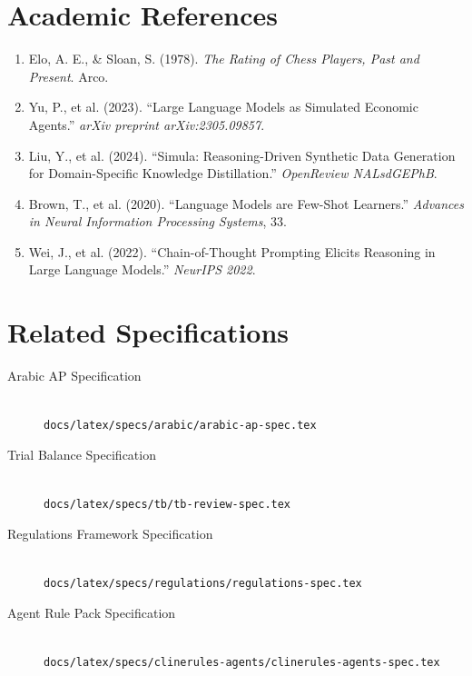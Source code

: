 \documentclass[12pt,a4paper,twoside]{report}
\begin{document}
\section{Academic References}

\begin{enumerate}
\item Elo, A. E., \& Sloan, S. (1978). \emph{The Rating of Chess Players, Past and Present}. Arco.

\item Yu, P., et al. (2023). ``Large Language Models as Simulated Economic Agents.''
\emph{arXiv preprint arXiv:2305.09857}.

\item Liu, Y., et al. (2024). ``Simula: Reasoning-Driven Synthetic Data Generation for
Domain-Specific Knowledge Distillation.'' \emph{OpenReview NALsdGEPhB}.

\item Brown, T., et al. (2020). ``Language Models are Few-Shot Learners.''
\emph{Advances in Neural Information Processing Systems}, 33.

\item Wei, J., et al. (2022). ``Chain-of-Thought Prompting Elicits Reasoning in Large
Language Models.'' \emph{NeurIPS 2022}.
\end{enumerate}

\section{Related Specifications}

\begin{description}
\item[Arabic AP Specification] \hfill \\
\texttt{docs/latex/specs/arabic/arabic-ap-spec.tex}

\item[Trial Balance Specification] \hfill \\
\texttt{docs/latex/specs/tb/tb-review-spec.tex}

\item[Regulations Framework Specification] \hfill \\
\texttt{docs/latex/specs/regulations/regulations-spec.tex}

\item[Agent Rule Pack Specification] \hfill \\
\texttt{docs/latex/specs/clinerules-agents/clinerules-agents-spec.tex}
\end{description}
\end{document}
